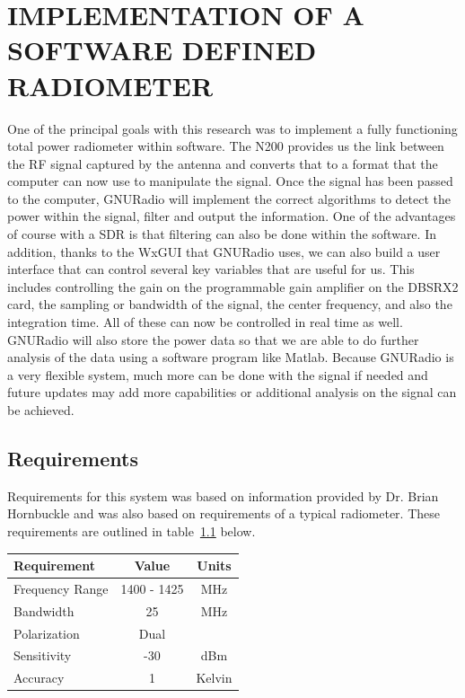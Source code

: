 

\chapter{IMPLEMENTATION OF A SOFTWARE DEFINED RADIOMETER}
One of the principal goals with this research was to implement a fully functioning total power radiometer within software.  The N200 provides us the link between the RF signal captured by the antenna and converts that to a format that the computer can now use to manipulate the signal.  Once the signal has been passed to the computer, GNURadio will implement the correct algorithms to detect the power within the signal, filter and output the information.  One of the advantages of course with a SDR is that filtering can also be done within the software.  In addition, thanks to the WxGUI that GNURadio uses, we can also build a user interface that can control several key variables that are useful for us.  This includes controlling the gain on the programmable gain amplifier on the DBSRX2 card, the sampling or bandwidth of the signal, the center frequency, and also the integration time.  All of these can now be controlled in real time as well.  GNURadio will also store the power data so that we are able to do further analysis of the data using a software program like Matlab.  Because GNURadio is a very flexible system, much more can be done with the signal if needed and future updates may add more capabilities or additional analysis on the signal can be achieved.

\section{Requirements}

Requirements for this system was based on information provided by Dr. Brian Hornbuckle and was also based on requirements of a typical radiometer.  These requirements are outlined in table~\ref{requirements} below.


\begin{table}[h!tb] \centering
{}
\label{requirements}
\begin{tabular}{lcc} \hline
\textbf{Requirement} & \textbf{Value} & \textbf{Units} \\ \hline
Frequency Range & 1400 - 1425 & MHz \\
Bandwidth & 25 & MHz \\
Polarization & Dual &  \\ 
Sensitivity & -30 & dBm \\
Accuracy & 1 & Kelvin \\ \hline
\end{tabular}
\end{table}

